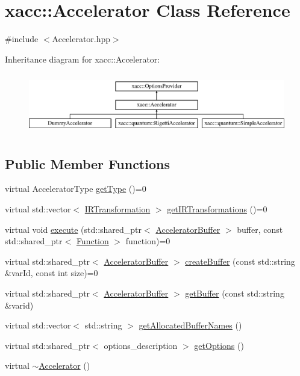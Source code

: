 \hypertarget{a01084}{}\section{xacc\+:\+:Accelerator Class Reference}
\label{a01084}


{\ttfamily \#include $<$Accelerator.\+hpp$>$}

Inheritance diagram for xacc\+:\+:Accelerator\+:\begin{figure}[H]
\begin{center}
\leavevmode
\includegraphics[height=2.679426cm]{a01084}
\end{center}
\end{figure}
\subsection*{Public Member Functions}
\begin{DoxyCompactItemize}
\item 
virtual Accelerator\+Type \hyperlink{a01084_aaffc3e4bb9880eb5041b1b58ee4c2665}{get\+Type} ()=0
\item 
virtual std\+::vector$<$ \hyperlink{a01152}{I\+R\+Transformation} $>$ \hyperlink{a01084_ad6e4a642dcb24e552675bcbeff1e1b04}{get\+I\+R\+Transformations} ()=0
\item 
virtual void \hyperlink{a01084_a89b3f3e6294f228abf03a410b0fb1674}{execute} (std\+::shared\+\_\+ptr$<$ \hyperlink{a01096}{Accelerator\+Buffer} $>$ buffer, const std\+::shared\+\_\+ptr$<$ \hyperlink{a01124}{Function} $>$ function)=0
\item 
virtual std\+::shared\+\_\+ptr$<$ \hyperlink{a01096}{Accelerator\+Buffer} $>$ \hyperlink{a01084_a064a2dbd58338364115c260267806945}{create\+Buffer} (const std\+::string \&var\+Id, const int size)=0
\item 
virtual std\+::shared\+\_\+ptr$<$ \hyperlink{a01096}{Accelerator\+Buffer} $>$ \hyperlink{a01084_ab3820be326e28a553fed1a824f4d41d0}{get\+Buffer} (const std\+::string \&varid)
\item 
virtual std\+::vector$<$ std\+::string $>$ \hyperlink{a01084_ae1463d7e405df89fa4af47e8922f4b82}{get\+Allocated\+Buffer\+Names} ()
\item 
virtual std\+::shared\+\_\+ptr$<$ options\+\_\+description $>$ \hyperlink{a01084_a98c9eda6b54367c75667ecfbbf167979}{get\+Options} ()
\item 
virtual \hyperlink{a01084_aed88ab0d71b765f0b0f512684ccd4b55}{$\sim$\+Accelerator} ()
\end{DoxyCompactItemize}
